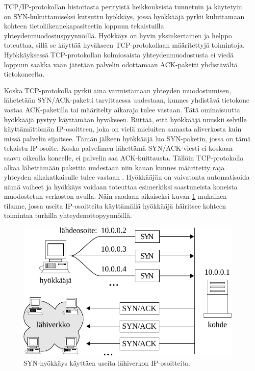 TCP/IP-protokollan historiasta perityistä heikkouksista tunnetuin ja
käytetyin on SYN-hukuttamiseksi kutsuttu hyökkäys, jossa hyökkääjä
pyrkii kuluttamaan kohteen tietoliikennekapasiteetin loppuun
tekaistuilla yhteydenmuodostuspyynnöillä. Hyökkäys on hyvin
yksinkertainen ja helppo toteuttaa, sillä se käyttää hyväkseen
TCP-protokollaan määritettyjä toimintoja. Hyökkäyksessä
TCP-protokollan kolmiosaista yhteydenmuodostusta ei viedä loppuun
saakka vaan jätetään palvelin odottamaan ACK-paketti yhdistävältä
tietokoneelta.

Koska TCP-protokolla pyrkii aina varmistamaan yhteyden muodostumisen,
lähetetään SYN/ACK-paketti tarvittaessa uudestaan, kunnes yhdistävä
tietokone vastaa ACK-paketilla tai määritelty aikaraja tulee
vastaan. Tätä ominaisuutta hyökkääjä pystyy käyttämään
hyväkseen. Riittää, että hyökkääjä nuuskii selville käyttämättömän
IP-osoitteen, joka on vielä mieluiten samasta aliverkosta kuin missä
palvelin sijaitsee. Tämän jälkeen hyökkääjä luo SYN-paketin, jossa on
tämä tekaistu IP-osoite. Koska palvelimen lähettämä SYN/ACK-viesti ei
koskaan saavu oikealla koneelle, ei palvelin saa ACK-kuittausta. Tällöin
TCP-protokolla alkaa lähettämään pakettia uudestaan niin kauan
kunnes määritetty raja yhteyden aikakatkaisulle tulee vastaan
\cite{STACK}. Hyökkääjän on vaivatonta automatisoida nämä vaiheet ja
hyökkäys voidaan toteuttaa esimerkiksi saastuneista koneista
muodostetun verkoston avulla. Näin saadaan aikaiseksi kuvan \ref{syn}
mukainen tilanne, jossa useita IP-osoitteita käyttämällä hyökkääjä
häiritsee kohteen toimintaa turhilla yhteydenottopyynnöillä.

\begin{figure}[hpt]
\centering
\includegraphics[width=12cm]{pics/syn.pdf}
\caption{SYN-hyökkäys käyttäen useita lähiverkon IP-osoitteita.}
\label{syn}
\end{figure}

